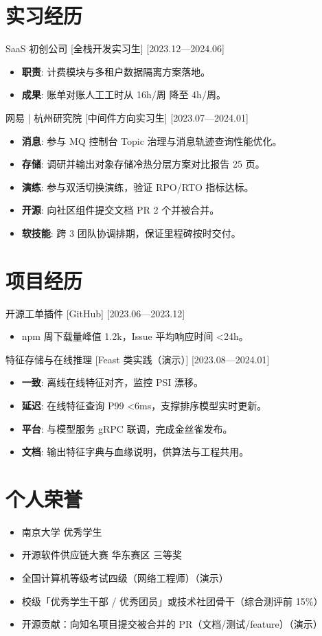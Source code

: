\documentclass{resume-photo}
\begin{document}
\section{实习经历}
\ResumeItem
{SaaS 初创公司}
[\textnormal{全栈开发实习生}]
[2023.12—2024.06]

\begin{itemize}
  \item \textbf{职责}: 计费模块与多租户数据隔离方案落地。
  \item \textbf{成果}: 账单对账人工工时从 16h/周 降至 4h/周。
\end{itemize}


\ResumeItem
{网易 | 杭州研究院}
[\textnormal{中间件方向实习生}]
[2023.07—2024.01]

\begin{itemize}
  \item \textbf{消息}: 参与 MQ 控制台 Topic 治理与消息轨迹查询性能优化。
  \item \textbf{存储}: 调研并输出对象存储冷热分层方案对比报告 25 页。
  \item \textbf{演练}: 参与双活切换演练，验证 RPO/RTO 指标达标。
  \item \textbf{开源}: 向社区组件提交文档 PR 2 个并被合并。
  \item \textbf{软技能}: 跨 3 团队协调排期，保证里程碑按时交付。
\end{itemize}



\section{项目经历}
\ResumeItem
{开源工单插件}
[\textnormal{GitHub}]
[2023.06—2023.12]

\begin{itemize}
  \item npm 周下载量峰值 1.2k，Issue 平均响应时间 <24h。
\end{itemize}


\ResumeItem
{特征存储与在线推理}
[\textnormal{Feast 类实践（演示）}]
[2023.08—2024.01]

\begin{itemize}
  \item \textbf{一致}: 离线在线特征对齐，监控 PSI 漂移。
  \item \textbf{延迟}: 在线特征查询 P99 <6ms，支撑排序模型实时更新。
  \item \textbf{平台}: 与模型服务 gRPC 联调，完成金丝雀发布。
  \item \textbf{文档}: 输出特征字典与血缘说明，供算法与工程共用。
\end{itemize}



\section{个人荣誉}
\begin{itemize}
  \item 南京大学 优秀学生
  \item 开源软件供应链大赛 华东赛区 三等奖
  \item 全国计算机等级考试四级（网络工程师）（演示）
  \item 校级「优秀学生干部 / 优秀团员」或技术社团骨干（综合测评前 15\%）
  \item 开源贡献：向知名项目提交被合并的 PR（文档/测试/feature）（演示）
\end{itemize}
\end{document}
